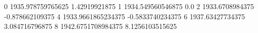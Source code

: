 0 1935.978759765625 1.42919921875
1 1934.549560546875 0.0
2 1933.6708984375 -0.878662109375
4 1933.9661865234375 -0.5833740234375
6 1937.63427734375 3.084716796875
8 1942.6751708984375 8.1256103515625
